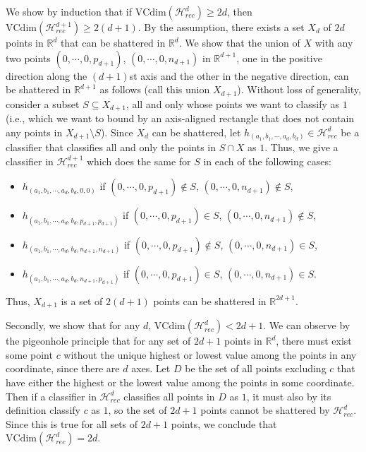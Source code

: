 \documentclass[a4paper,12pt]{article}
\theoremstyle{remark}
\begin{document}
\begin{itemize}
            We show by induction that if $\mathrm{VCdim}(\mathcal{H}_{rec}^d) \geq 2d$, then $\mathrm{VCdim}(\mathcal{H}_{rec}^{d + 1}) \geq 2(d + 1)$. By the assumption, there exists a set $X_d$ of $2d$ points in $\mathbb{R}^d$ that can be shattered in $\mathbb{R}^d$. We show that the union of $X$ with any two points $(0, \cdots, 0, p_{d + 1})$, $(0, \cdots, 0, n_{d + 1})$ in $\mathbb{R}^{d + 1}$, one in the positive direction along the $(d + 1)$st axis and the other in the negative direction, can be shattered in $\mathbb{R}^{d + 1}$ as follows (call this union $X_{d + 1}$). Without loss of generality, consider a subset $S \subseteq X_{d + 1}$, all and only whose points we want to classify as $1$ (i.e., which we want to bound by an axis-aligned rectangle that does not contain any points in $X_{d + 1} \setminus S$). Since $X_d$ can be shattered, let $h_{(a_1, b_1, \cdots, a_d, b_d)} \in \mathcal{H}_{rec}^d$ be a classifier that classifies all and only the points in $S \cap X$ as $1$. Thus, we give a classifier in $\mathcal{H}_{rec}^{d + 1}$ which does the same for $S$ in each of the following cases:
            \begin{itemize}
                \item
                    $h_{(a_1, b_1, \cdots, a_d, b_d, 0, 0)}$ if $(0, \cdots, 0, p_{d + 1}) \notin S$, $(0, \cdots, 0, n_{d + 1}) \notin S$,
                \item
                    $h_{(a_1, b_1, \cdots, a_d, b_d, p_{d + 1}, p_{d + 1})}$ if $(0, \cdots, 0, p_{d + 1}) \in S$, $(0, \cdots, 0, n_{d + 1}) \notin S$,
                \item
                    $h_{(a_1, b_1, \cdots, a_d, b_d, n_{d + 1}, n_{d + 1})}$ if $(0, \cdots, 0, p_{d + 1}) \notin S$, $(0, \cdots, 0, n_{d + 1}) \in S$,
                \item
                    $h_{(a_1, b_1, \cdots, a_d, b_d, n_{d + 1}, p_{d + 1})}$ if $(0, \cdots, 0, p_{d + 1}) \in S$, $(0, \cdots, 0, n_{d + 1}) \in S$.
            \end{itemize}
            Thus, $X_{d + 1}$ is a set of $2(d + 1)$ points can be shattered in $\mathbb{R}^{2d + 1}$. \par
            Secondly, we show that for any $d$, $\mathrm{VCdim}(\mathcal{H}_{rec}^d) < 2d + 1$. We can observe by the pigeonhole principle that for any set of $2d + 1$ points in $\mathbb{R}^d$, there must exist some point $c$ without the unique highest or lowest value among the points in any coordinate, since there are $d$ axes. Let $D$ be the set of all points excluding $c$ that have either the highest or the lowest value among the points in some coordinate. Then if a classifier in $\mathcal{H}_{rec}^d$ classifies all points in $D$ as $1$, it must also by its definition classify $c$ as $1$, so the set of $2d + 1$ points cannot be shattered by $\mathcal{H}_{rec}^d$. Since this is true for all sets of $2d + 1$ points, we conclude that $\mathrm{VCdim}(\mathcal{H}_{rec}^d) = 2d$.
    \end{itemize}
\end{document}
